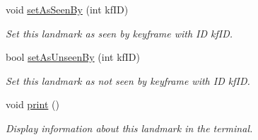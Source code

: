 \begin{DoxyCompactItemize}
\mbox{\label{structLandmark_aa259d66ed80334a6064ef4fe612eb89b}} 
void \hyperlink{structLandmark_aa259d66ed80334a6064ef4fe612eb89b}{set\+As\+Seen\+By} (int kf\+ID)
\begin{DoxyCompactList}\small\item\em Set this landmark as seen by keyframe with ID kf\+ID. \end{DoxyCompactList}\item 
\mbox{\label{structLandmark_aa3422d34478d9bd37baf1dcdc67b60a8}} 
bool \hyperlink{structLandmark_aa3422d34478d9bd37baf1dcdc67b60a8}{set\+As\+Unseen\+By} (int kf\+ID)
\begin{DoxyCompactList}\small\item\em Set this landmark as not seen by keyframe with ID kf\+ID. \end{DoxyCompactList}\item 
\mbox{\label{structLandmark_afdba741cc3b29eef1784aa9a9ff8c032}} 
void \hyperlink{structLandmark_afdba741cc3b29eef1784aa9a9ff8c032}{print} ()
\begin{DoxyCompactList}\small\item\em Display information about this landmark in the terminal. \end{DoxyCompactList}\end{DoxyCompactItemize}
